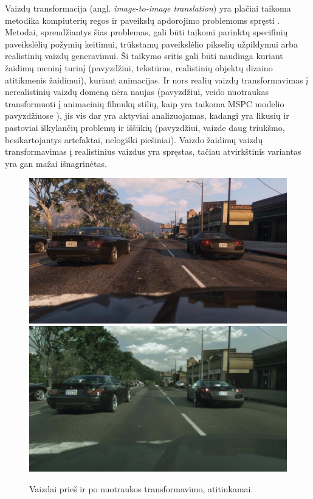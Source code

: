 \documentclass{VUMIFPSbakalaurinis}
\begin{document}
\tableofcontents

    Vaizdų transformacija (angl. \emph{image-to-image  translation}) yra plačiai taikoma metodika kompiuterių regos ir paveikslų apdorojimo problemoms spręsti \cite{ImTImTr}. Metodai, sprendžiantys šias problemas, gali būti taikomi parinktų specifinių paveikslėlių požymių keitimui, trūkstamų paveikslėlio pikselių užpildymui arba realistinių vaizdų generavimui. Ši taikymo sritis gali būti naudinga kuriant žaidimų meninį turinį (pavyzdžiui, tekstūras, realistinių objektų dizaino atitikmenis žaidimui), kuriant animacijas. Ir nors realių vaizdų transformavimas į nerealistinių vaizdų domeną nėra naujas (pavyzdžiui, veido nuotraukas transformuoti į animacinių filmukų stilių, kaip yra taikoma MSPC modelio pavyzdžiuose \cite{Mspc}), jis vis dar yra aktyviai analizuojamas, kadangi yra likusių ir pastoviai iškylančių problemų ir iššūkių (pavyzdžiui, vaizde daug triukšmo, besikartojantys artefaktai, nelogiški piešiniai). Vaizdo žaidimų vaizdų transformavimas į realistinius vaizdus yra spręstas, tačiau atvirkštinis variantas yra gan mažai išnagrinėtas.

    \begin{figure}[H]
        \centering
        \includegraphics[scale=0.3]{img/EnPhEn_before}
        \includegraphics[scale=0.3]{img/EnPhEn_after}
        \caption{Vaizdai prieš ir po nuotraukos transformavimo, atitinkamai.\cite{EnPhEn}}
        \label{img:mlp}
    \end{figure}
    
\end{document}
